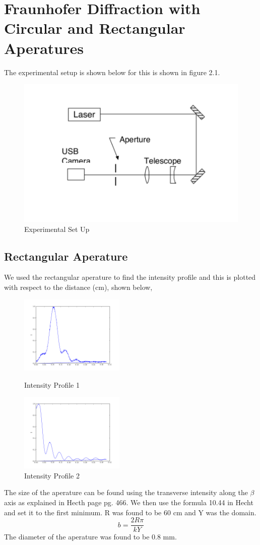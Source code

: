 \documentclass[paper=a4, fontsize=11pt]{scrartcl} %
\numberwithin{equation}{section}
\numberwithin{figure}{section}
\numberwithin{table}{section}
\begin{document}
\section{Fraunhofer Diffraction with Circular and Rectangular Aperatures}
The experimental setup is shown below for this is shown in figure 2.1. 
\begin{figure}[H]
\caption{Experimental Set Up}
\begin{center}
\includegraphics[scale=0.5]{diff}
\end{center}
\end{figure}
\subsection{Rectangular Aperature}
We used the rectangular aperature to find the intensity profile and this is plotted with respect to the distance (cm), shown below,
\begin{figure}[H]
\centering
\parbox{5cm}{
\includegraphics[width=5cm]{rec1}
\caption{Intensity Profile 1}}
\qquad
\begin{minipage}{5cm}
\includegraphics[width=5cm]{rec2}
\caption{Intensity Profile 2}
\end{minipage}
\end{figure}
The size of the aperature can be found using the transverse intensity along the $\beta$ axis as explained in Hecth page pg. 466. We then use the formula 10.44 in Hecht and set it to the first minimum. R was found to be 60 cm and Y was the domain. 
\begin{equation}
b = \frac{2R\pi}{kY}
\end{equation}
The diameter of the aperature was found to be 0.8 mm.
\end{document}
